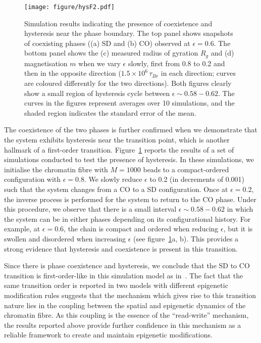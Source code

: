 \documentclass[12pt]{article}
\newcommand*{\DataFig}{/Users/MichaelChiang/Desktop/epigenetics_data/}
\begin{document}
\begin{figure}[H]
\vspace{1cm}
\centering
\centerline{\texttt{[image: figure/hysF2.pdf]}}
\caption{Simulation results indicating the presence of coexistence and hysteresis near the phase boundary. The top panel shows snapshots of coexisting phases ((a) SD and (b) CO) observed at $\epsilon = 0.6$. The bottom panel shows the (c) measured radius of gyration $R_g$ and (d) magnetisation $m$ when we vary $\epsilon$ slowly, first from 0.8 to 0.2 and then in the opposite direction ($1.5 \times 10^6\,\tau_{Br}$ in each direction; curves are coloured differently for the two directions). Both figures clearly show a small region of hysteresis cycle between $\epsilon \sim 0.58 - 0.62$. The curves in the figures represent averages over 10 simulations, and the shaded region indicates the standard error of the mean.}
\label{fig:hysF2}
\end{figure}
\pagebreak
The coexistence of the two phases is further confirmed when we demonstrate that the system exhibits hysteresis near the transition point, which is another hallmark of a first-order transition. Figure~\ref{fig:hysF2} reports the results of a set of simulations conducted to test the presence of hysteresis. In these simulations, we initialise the chromatin fibre with $M = 1000$ beads to a compact-ordered configuration with $\epsilon = 0.8$. We slowly reduce $\epsilon$ to 0.2 (in decrements of 0.001) such that the system changes from a CO to a SD configuration. Once at $\epsilon = 0.2$, the inverse process is performed for the system to return to the CO phase. Under this procedure, we observe that there is a small interval $\epsilon \sim 0.58 - 0.62$ in which the system can be in either phases depending on its configurational history. For example, at $\epsilon = 0.6$, the chain is compact and ordered when reducing $\epsilon$, but it is swollen and disordered when increasing $\epsilon$ (see figure~\ref{fig:hysF2}a, b). This provides a strong evidence that hysteresis and coexistence is present in this transition.

Since there is phase coexistence and hysteresis, we conclude that the SD to CO transition is first-order-like in this simulation model as in~\cite{michieletto2016}. The fact that the same transition order is reported in two models with different epigenetic modification rules suggests that the mechanism which gives rise to this transition nature lies in the coupling between the spatial and epigenetic dynamics of the chromatin fibre. As this coupling is the essence of the ``read-write'' mechanism, the results reported above provide further confidence in this mechanism as a reliable framework to create and maintain epigenetic modifications. 
\end{document}

